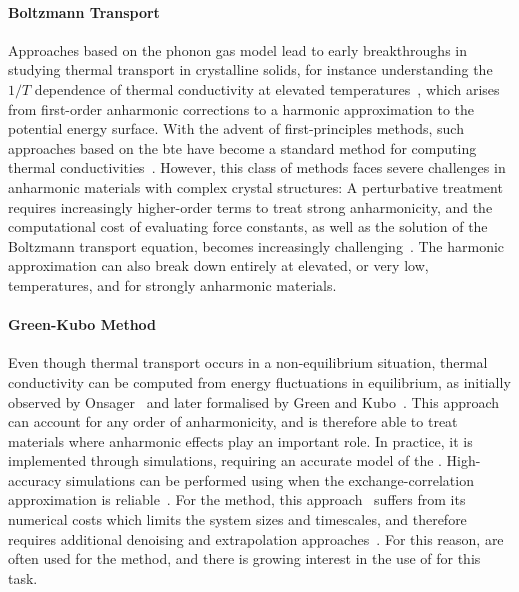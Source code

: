 \paragraph{Boltzmann Transport} Approaches based on the phonon gas model lead to early breakthroughs in studying thermal transport in crystalline solids, for instance understanding the $1/T$ dependence of thermal conductivity at elevated temperatures~\cite{d1912t}, which arises from first-order anharmonic corrections to a harmonic approximation to the potential energy surface. With the advent of first-principles methods, such approaches based on the \gls{bte} have become a standard method for computing thermal conductivities~\cite{bmms2007t,fr2016t,ibdb2019t,smm2019t}. However, this class of methods faces severe challenges in anharmonic materials with complex crystal structures: A perturbative treatment requires increasingly higher-order terms to treat strong anharmonicity, and the computational cost of evaluating force constants, as well as the solution of the Boltzmann transport equation, becomes increasingly challenging~\cite{rb2018t}. The harmonic approximation can also break down entirely at elevated, or very low, temperatures, and for strongly anharmonic materials.

\paragraph{Green-Kubo Method} Even though thermal transport occurs in a non-equilibrium situation, thermal conductivity can be computed from energy fluctuations in equilibrium, as initially observed by Onsager~\cite{o1931At,o1931Bt} and later formalised by Green and Kubo~\cite{g1952t,k1957t,kyn1957t}.
This approach can account for any order of anharmonicity, and is therefore able to treat materials where anharmonic effects play an important role.
In practice, it is implemented through \md simulations, requiring an accurate model of the \bo \pes. 
High-accuracy \md simulations can be performed using \dft when the exchange-correlation approximation is reliable~\cite{thxy2022p}. For the \gk method, this  approach~\cite{mub2016t,crs2017t} suffers from its numerical costs which limits the system sizes and timescales, and therefore requires additional denoising and extrapolation approaches~\cite{crs2017t,meb2020t,ksc2023t}.
For this reason, \ffs are often used for the \gk method, and there is growing interest in the use of \mlps for this task.

